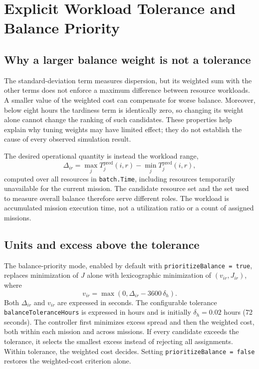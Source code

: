 \section{Explicit Workload Tolerance and Balance Priority}
\label{sec:balance-priority}

\subsection{Why a larger balance weight is not a tolerance}

The standard-deviation term measures dispersion, but its weighted sum with
the other terms does not enforce a maximum difference between resource
workloads. A smaller value of the weighted cost can compensate for worse
balance. Moreover, below eight hours the tardiness term is identically zero,
so changing its weight alone cannot change the ranking of such candidates.
These properties help explain why tuning weights may have limited effect;
they do not establish the cause of every observed simulation result.

The desired operational quantity is instead the workload range,
\begin{equation}
	\Delta_{ir}=\max_j T_j^{\mathrm{pred}}(i,r)
	-\min_j T_j^{\mathrm{pred}}(i,r),
\end{equation}
computed over all resources in \texttt{batch.Time}, including resources
temporarily unavailable for the current mission. The candidate resource set
and the set used to measure overall balance therefore serve different roles.
The workload is accumulated mission execution time, not a utilization ratio
or a count of assigned missions.

\subsection{Units and excess above the tolerance}

The balance-priority mode, enabled by default with
\texttt{prioritizeBalance = true},
replaces minimization of $J$ alone with lexicographic minimization of
$(v_{ir},J_{ir})$, where
\begin{equation}
	v_{ir}=\max\left(0,\Delta_{ir}-3600\,\delta_h\right).
\end{equation}
Both $\Delta_{ir}$ and $v_{ir}$ are expressed in seconds. The configurable
tolerance \texttt{balanceToleranceHours} is expressed in hours and is initially
$\delta_h=0.02$ hours (72 seconds). The controller first minimizes excess
spread and then the weighted cost, both within each mission and across
missions. If every candidate exceeds the tolerance, it selects the smallest
excess instead of rejecting all assignments. Within tolerance, the weighted
cost decides. Setting \texttt{prioritizeBalance = false} restores the
weighted-cost criterion alone.

